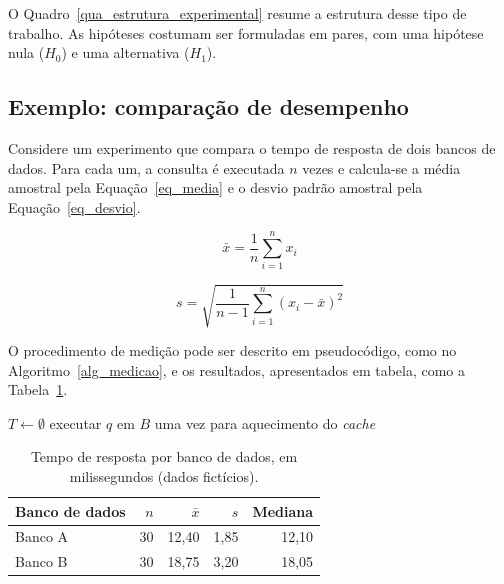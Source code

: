 O Quadro~\ref{qua_estrutura_experimental} resume a estrutura desse tipo de trabalho. As hipóteses costumam ser formuladas em pares, com uma hipótese nula ($H_0$) e uma alternativa ($H_1$).

\subsection{Exemplo: comparação de desempenho}

Considere um experimento que compara o tempo de resposta de dois bancos de dados. Para cada um, a consulta é executada $n$ vezes e calcula-se a média amostral pela Equação~\eqref{eq_media} e o desvio padrão amostral pela Equação~\eqref{eq_desvio}.

\begin{equation}
	\bar{x} = \frac{1}{n} \sum_{i=1}^{n} x_i
	\label{eq_media}
\end{equation}

\begin{equation}
	s = \sqrt{\frac{1}{n-1} \sum_{i=1}^{n} \left( x_i - \bar{x} \right)^2}
	\label{eq_desvio}
\end{equation}

O procedimento de medição pode ser descrito em pseudocódigo, como no Algoritmo~\ref{alg_medicao}, e os resultados, apresentados em tabela, como a Tabela~\ref{tab_resultados_experimento}.

\begin{algorithm}[H]
	\SetAlgoLined
	$T \leftarrow \emptyset$\;
	executar $q$ em $B$ uma vez para aquecimento do \textit{cache}\;
	\;
	\caption{Medição do tempo de resposta}
	\label{alg_medicao}
\end{algorithm}

\begin{table}[htb]
	\centering
	\caption{Tempo de resposta por banco de dados, em milissegundos (dados fictícios).}
	\label{tab_resultados_experimento}
	\begin{tabular}{lrrrr}
		\toprule
		Banco de dados & $n$ & $\bar{x}$ & $s$ & Mediana \\
		\midrule
		Banco A & 30 & 12,40 & 1,85 & 12,10 \\
		Banco B & 30 & 18,75 & 3,20 & 18,05 \\
		\bottomrule
	\end{tabular}
\end{table}
